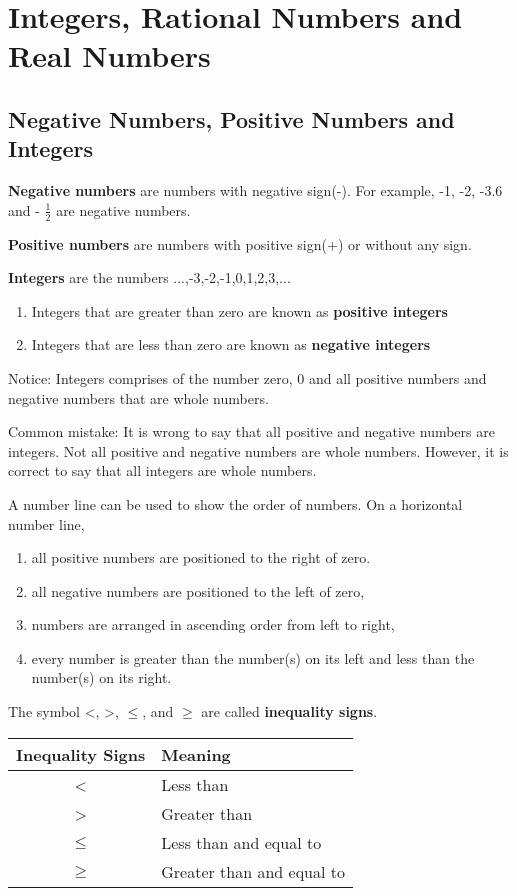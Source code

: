 \documentclass[../main]{subfiles}
\begin{document}
\section{Integers, Rational Numbers and Real Numbers}

\subsection{Negative Numbers, Positive Numbers and Integers}
\textbf{Negative numbers} are numbers with negative sign(-). For example, -1,
-2, -3.6 and - \(\frac 1 2 \) are negative numbers.

\textbf{Positive numbers} are numbers with positive sign(+) or without any sign.

\textbf{Integers} are the numbers ...,-3,-2,-1,0,1,2,3,...
\begin{enumerate}
\item Integers that are greater than zero are known as \textbf{positive
    integers}
\item Integers that are less than zero are known as \textbf{negative integers}
\end{enumerate}
Notice: Integers comprises of the number zero, 0 and all positive numbers and
negative numbers that are whole numbers.

Common mistake:
It is wrong to say that all positive and negative numbers are integers. Not all
positive and negative numbers are whole numbers. However, it is correct to say
that all integers are whole numbers.

A number line can be used to show the order of numbers. On a horizontal number
line,
\begin{enumerate}
\item all positive numbers are positioned to the right of zero.
\item all negative numbers are positioned to the left of zero,
\item numbers are arranged in ascending order from left to right,
\item every number is greater than the number(s) on its left and less than the
  number(s) on its right.
  
\end{enumerate}

The symbol \textless , \textgreater ,  \(\leq\), and \(\geq\) are called \textbf{inequality signs}.
\begin{center}
  \begin{tabular}{| c| l |  }
    \hline
    Inequality Signs & Meaning \\ 
    \hline
    \textless & Less than \\  
    \hline
    \textgreater  & Greater than \\   
    \hline

    \(\leq \) & Less than and equal to \\   
    \hline
    \(\geq \) & Greater than and equal to \\   
    \hline
  \end{tabular}
\end{center}
\end{document}
